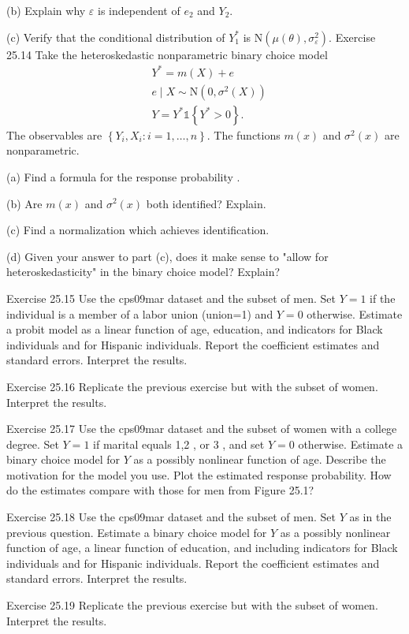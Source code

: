\documentclass[10pt]{article}
\begin{document}
(b) Explain why $\varepsilon$ is independent of $e_{2}$ and $Y_{2}$.

(c) Verify that the conditional distribution of $Y_{1}^{*}$ is $\mathrm{N}\left(\mu(\theta), \sigma_{\varepsilon}^{2}\right)$. Exercise 25.14 Take the heteroskedastic nonparametric binary choice model
$$
\begin{aligned}
&Y^{*}=m(X)+e \\
&e \mid X \sim \mathrm{N}\left(0, \sigma^{2}(X)\right) \\
&Y=Y^{*} \mathbb{1}\left\{Y^{*}>0\right\} .
\end{aligned}
$$
The observables are $\left\{Y_{i}, X_{i}: i=1, \ldots, n\right\}$. The functions $m(x)$ and $\sigma^{2}(x)$ are nonparametric.

(a) Find a formula for the response probability .

(b) Are $m(x)$ and $\sigma^{2}(x)$ both identified? Explain.

(c) Find a normalization which achieves identification.

(d) Given your answer to part (c), does it make sense to "allow for heteroskedasticity" in the binary choice model? Explain?

Exercise 25.15 Use the cps09mar dataset and the subset of men. Set $Y=1$ if the individual is a member of a labor union (union=1) and $Y=0$ otherwise. Estimate a probit model as a linear function of age, education, and indicators for Black individuals and for Hispanic individuals. Report the coefficient estimates and standard errors. Interpret the results.

Exercise 25.16 Replicate the previous exercise but with the subset of women. Interpret the results.

Exercise 25.17 Use the cps09mar dataset and the subset of women with a college degree. Set $Y=1$ if marital equals 1,2 , or 3 , and set $Y=0$ otherwise. Estimate a binary choice model for $Y$ as a possibly nonlinear function of age. Describe the motivation for the model you use. Plot the estimated response probability. How do the estimates compare with those for men from Figure 25.1?

Exercise 25.18 Use the cps09mar dataset and the subset of men. Set $Y$ as in the previous question. Estimate a binary choice model for $Y$ as a possibly nonlinear function of age, a linear function of education, and including indicators for Black individuals and for Hispanic individuals. Report the coefficient estimates and standard errors. Interpret the results.

Exercise 25.19 Replicate the previous exercise but with the subset of women. Interpret the results.
\end{document}
